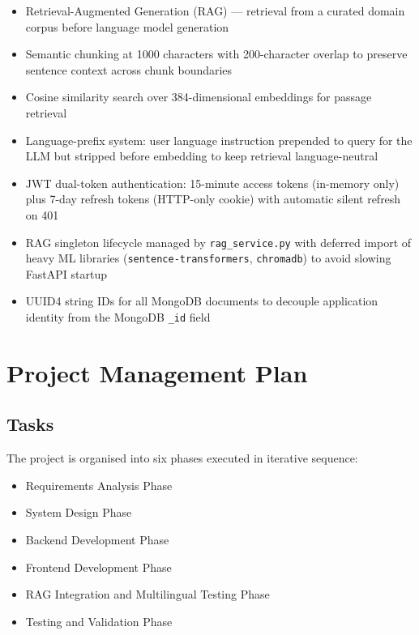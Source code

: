 \begin{itemize}
  \item Retrieval-Augmented Generation (RAG) \cite{lewis2020rag} --- retrieval from a
        curated domain corpus before language model generation
  \item Semantic chunking at 1000 characters with 200-character overlap to preserve
        sentence context across chunk boundaries
  \item Cosine similarity search over 384-dimensional embeddings for passage retrieval
  \item Language-prefix system: user language instruction prepended to query for the LLM
        but stripped before embedding to keep retrieval language-neutral
  \item JWT dual-token authentication: 15-minute access tokens (in-memory only) plus
        7-day refresh tokens (HTTP-only cookie) with automatic silent refresh on 401
  \item RAG singleton lifecycle managed by \texttt{rag\_service.py} with deferred
        import of heavy ML libraries (\texttt{sentence-transformers}, \texttt{chromadb})
        to avoid slowing FastAPI startup
  \item UUID4 string IDs for all MongoDB documents to decouple application identity from
        the MongoDB \texttt{\_id} field
\end{itemize}

\section{Project Management Plan}

\subsection{Tasks}

The project is organised into six phases executed in iterative sequence:

\begin{itemize}
  \item Requirements Analysis Phase
  \item System Design Phase
  \item Backend Development Phase
  \item Frontend Development Phase
  \item RAG Integration and Multilingual Testing Phase
  \item Testing and Validation Phase
\end{itemize}

